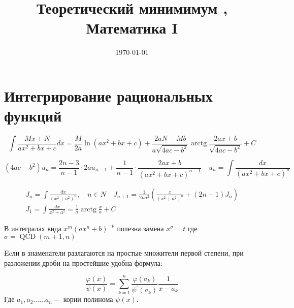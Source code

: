 \documentclass[a4paper,12pt]{article}
\title{Теоретический минимимум , Математика I}
\date{\today}
\begin{document}
	
	\maketitle
	\section{Интегрирование рациональных функций}
	\begin{equation}
	\int \frac{M x+N}{a x^{2}+b x+c} d x=\frac{M}{2 a} \ln \left(a x^{2}+b x+c\right)+\frac{2 a N-M b}{a \sqrt{4 a c-b^{2}}}  \operatorname{arctg} \frac{2 a x+b}{\sqrt{4 a c-b^{2}}}+C 
	\end{equation}
	
	\begin{equation}
	{\left(4 a c-b^{2}\right) u_{n}=\frac{2 n-3}{n-1} \cdot 2 a u_{n-1}+\frac{1}{n-1} \cdot \frac{2 a x+b}{\left(a x^{2}+b x+c\right)^{n-1}}} \quad  {u_{n}=\int \frac{d x}{\left(a x^{2}+b x+c\right)^{n}}}
	\end{equation}

	
	\begin{equation}
	\begin{aligned}
	J_{n}=\int \frac{d x}{\left(x^{2}+a^{2}\right)^{n}}, \quad n \in N \quad
	J_{n+1}=\frac{1}{2 n a^{2}}\left(\frac{x}{\left(x^{2}+a^{2}\right)^{n}}+(2 n-1) J_{n}\right)\\
	J_{1}=\int \frac{d x}{x^{2}+a^{2}}=\frac{1}{a} \operatorname{arctg} \frac{x}{a}+C
	\end{aligned}
	\end{equation}
	
	

	
	В интегралах вида $x^{m}\left(a x^{n}+b\right)^{-p}$ полезна замена $x^{\sigma}=t$ где $ \sigma=\operatorname{QCD}\left(m+1, n\right) $
	
	\par
	
	Ecли в знаменатели разлагаются на простые множители первой степени, при разложении дроби на простейшие удобна формула:
	
	$$
	\frac{\varphi(x)}{\psi(x)}=\sum_{k=1}^{n} \frac{\varphi\left(a_{k}\right)}{\psi^{\prime}\left(a_{k}\right)} \frac{1}{x-a_{k}}
	$$
	Где $a_{1}, a_{2} \dots \ldots a_{n} -$ корни полинома $ \psi(x) $.
	
\end{document}
